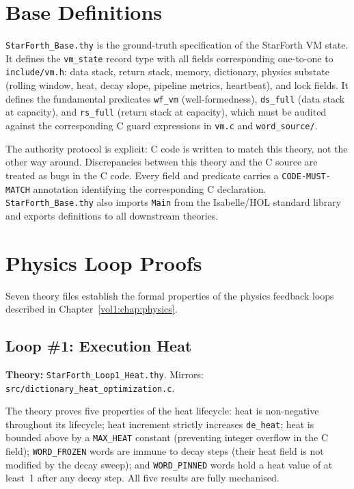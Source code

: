 \section{Base Definitions}
\label{vol1:sec:proofs:base}


\texttt{StarForth\_Base.thy} is the ground-truth specification of the StarForth
VM state. It defines the \texttt{vm\_state} record type with all fields
corresponding one-to-one to \texttt{include/vm.h}: data stack, return stack,
memory, dictionary, physics substate (rolling window, heat, decay slope,
pipeline metrics, heartbeat), and lock fields. It defines the fundamental
predicates \texttt{wf\_vm} (well-formedness), \texttt{ds\_full} (data stack at
capacity), and \texttt{rs\_full} (return stack at capacity), which must be
audited against the corresponding C guard expressions in \texttt{vm.c} and
\texttt{word\_source/}.

The authority protocol is explicit: C code is written to match this theory,
not the other way around. Discrepancies between this theory and the C source
are treated as bugs in the C code. Every field and predicate carries a
\texttt{CODE-MUST-MATCH} annotation identifying the corresponding C
declaration. \texttt{StarForth\_Base.thy} also imports
\texttt{Main} from the Isabelle/HOL standard library and exports definitions
to all downstream theories.

\section{Physics Loop Proofs}
\label{vol1:sec:proofs:loops}

Seven theory files establish the formal properties of the physics feedback
loops described in Chapter~\ref{vol1:chap:physics}.

\subsection{Loop \#1: Execution Heat}

\textbf{Theory:} \texttt{StarForth\_Loop1\_Heat.thy}.
Mirrors: \texttt{src/dictionary\_heat\_optimization.c}.

The theory proves five properties of the heat lifecycle: heat is non-negative
throughout its lifecycle; heat increment strictly increases \texttt{de\_heat};
heat is bounded above by a \texttt{MAX\_HEAT} constant (preventing integer
overflow in the C field); \texttt{WORD\_FROZEN} words are immune to decay
steps (their heat field is not modified by the decay sweep); and
\texttt{WORD\_PINNED} words hold a heat value of at least~1 after any decay
step. All five results are fully mechanised.

